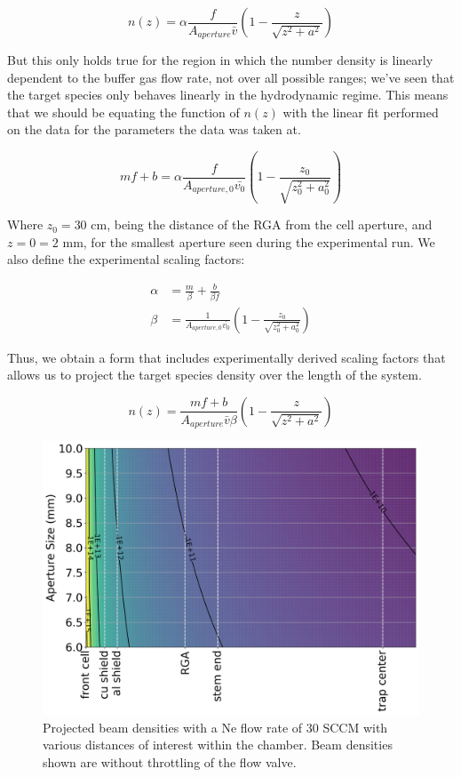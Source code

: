 \begin{equation*}
	n(z) = \alpha\frac{f}{A_{aperture} \bar{v}}\left(1-\frac{z}{\sqrt{z^2+a^2}}\right)
\end{equation*}

But this only holds true for the region in which the number density is linearly dependent to the buffer gas flow rate, not over all possible ranges; we've seen that the target species only behaves linearly in the hydrodynamic regime. This means that we should be equating the function of $n(z)$ with the linear fit performed on the data for the parameters the data was taken at.

\begin{equation*}
	mf+b = \alpha\frac{f}{A_{aperture, 0} \bar{v_0}}\left(1-\frac{z_0}{\sqrt{z_0^2+a_0^2}}\right) 
\end{equation*}

Where $z_0=30$ cm, being the distance of the RGA from the cell aperture, and $z=0=2$ mm, for the smallest aperture seen during the experimental run. We also define the experimental scaling factors:

\begin{align*}
	\alpha & = \frac{m}{\beta}+\frac{b}{\beta f} \\
	\beta & = \frac{1}{A_{aperture, 0} \bar{v_0}}\left(1-\frac{z_0}{\sqrt{z_0^2+a_0^2}}\right)
\end{align*}

Thus, we obtain a form that includes experimentally derived scaling factors that allows us to project the target species density over the length of the system.

\begin{equation}
	n(z) = \frac{mf+b}{A_{aperture} \bar{v} \beta}\left(1-\frac{z}{\sqrt{z^2+a^2}}\right)
	\label{eq: experimental n(z)}
\end{equation}

\begin{figure}[H]
	\centering
	\includegraphics[width=1\textwidth]{images/CBGB_beam_density_over_system.png}
	\caption{Projected beam densities with a Ne flow rate of 30 SCCM with various distances of interest within the chamber. Beam densities shown are without throttling of the  flow valve.}
	\label{fig: beam_density}
\end{figure}

